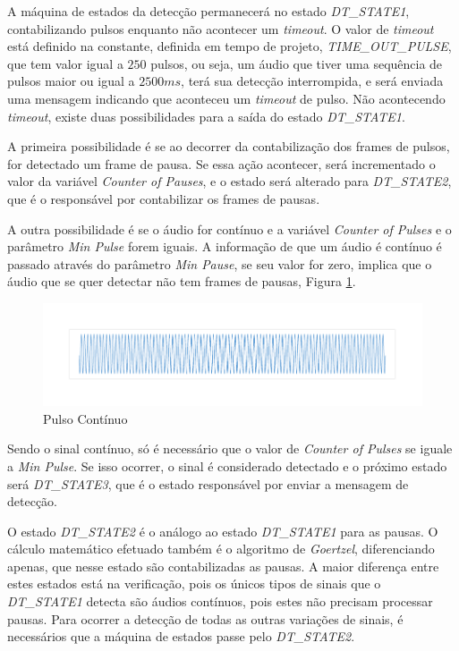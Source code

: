 \documentclass[monografia]{subfiles}
\begin{document}
				A máquina de estados da detecção permanecerá no estado \textit{DT\_STATE1}, contabilizando pulsos enquanto não acontecer um \textit{timeout}.
				O valor de \textit{timeout} está definido na constante, definida em tempo de projeto, \textit{TIME\_OUT\_PULSE}, que tem
				valor igual a $250$ pulsos, ou seja, um áudio que tiver uma sequência de pulsos maior ou igual a $2500 ms$, terá sua detecção interrompida, 
				e será enviada uma mensagem indicando que aconteceu um \textit{timeout} de pulso.
			 	Não acontecendo \textit{timeout}, existe duas possibilidades para a saída do estado \textit{DT\_STATE1}.
			 	
			 	A primeira possibilidade é se ao decorrer da contabilização dos frames de pulsos, for detectado um frame de pausa. Se essa ação acontecer, 
			 	será incrementado o valor da variável \textit{Counter of Pauses}, e o estado será alterado para \textit{DT\_STATE2}, 
			 	que é o responsável por contabilizar os frames de pausas.

			 	A outra possibilidade é se o áudio for contínuo e a variável \textit{Counter of Pulses} e o parâmetro \textit{Min Pulse} forem iguais. 
			 	A informação de que um áudio é contínuo é passado através do parâmetro \textit{Min Pause}, se seu valor for zero, implica que 
			 	o áudio que se quer detectar não tem frames de pausas, Figura \ref{fig:continuousPulse}. 

			 		\begin{figure}[!h]
					\centering
						\includegraphics[scale=1.15]{img/audios/pulsoCont.pdf}
					\caption{Pulso Contínuo}
					\label{fig:continuousPulse}
					\end{figure}

			 	Sendo o sinal contínuo, só é necessário que o valor de \textit{Counter of Pulses}
			 	se iguale a \textit{Min Pulse}. Se isso ocorrer, o sinal é considerado detectado e o próximo estado será \textit{DT\_STATE3}, que é o estado
			 	responsável por enviar a mensagem de detecção.


				\label{sec:dtState2Section}
				O estado \textit{DT\_STATE2} é o análogo ao estado \textit{DT\_STATE1} para as pausas. O cálculo matemático efetuado também é o 
				algoritmo de \textit{Goertzel}, diferenciando apenas, que nesse estado são contabilizadas as pausas. A maior diferença entre estes estados está
				na verificação, pois os únicos tipos de sinais que o \textit{DT\_STATE1} detecta são áudios contínuos, pois estes não precisam processar pausas. 
				Para ocorrer a detecção de todas as outras variações de sinais, é necessários que a máquina de estados passe pelo \textit{DT\_STATE2}.
\end{document}
